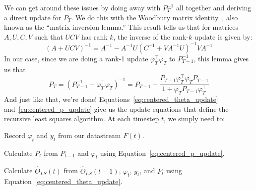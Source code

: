 We can get around these issues by doing away with $P_T^{-1}$ all together and
deriving a direct update for $P_T$. We do this with the Woodbury matrix
identity~\cite{woodbury1950inverting}, also known as the ``matrix inversion
lemma.'' This result tells us that for matrices $A, U, C, V$ such that $UCV$ has rank $k$, the inverse of the rank-$k$ update is given by:
\begin{equation}
  \label{eq:woodbury}
  \left(A + UCV\right)^{-1} = A^{-1} - A^{-1}U\left(C^{-1} + VA^{-1}U\right)^{-1}VA^{-1}
\end{equation}
In our case, since we are doing a rank-1 update $\varphi_T^\top \varphi_T$ to
$P_{T-1}^{-1}$, this lemma gives us that
\begin{equation}
  \label{eq:centered_p_update}
  P_T = \left(P_{T-1}^{-1} + \varphi_T^\top \varphi_T\right)^{-1} = P_{T - 1} - \frac{P_{T-1}\varphi_T^\top \varphi_T P_{T-1}}{1 + \varphi_T P_{T-1} \varphi_T^\top}
\end{equation}
And just like that, we're done! Equations~\ref{eq:centered_theta_update}
and~\ref{eq:centered_p_update} give us the update equations that define the
recursive least squares algorithm. At each timestep $t$, we simply need to:
\begin{enumerate}
\begin{singlespace}
  \item Record $\varphi_t$ and $y_t$ from our datastream $F(t)$. 
  \item Calculate $P_t$ from $P_{t-1}$ and $\varphi_t$ using Equation~\ref{eq:centered_p_update}. 
  \item Calculate $\hat\Theta_{LS}(t)$ from $\hat\Theta_{LS}(t-1)$, $\varphi_t$, $y_t$, and $P_{t}$ using Equation~\ref{eq:centered_theta_update}. 
\end{singlespace}
\end{enumerate}
